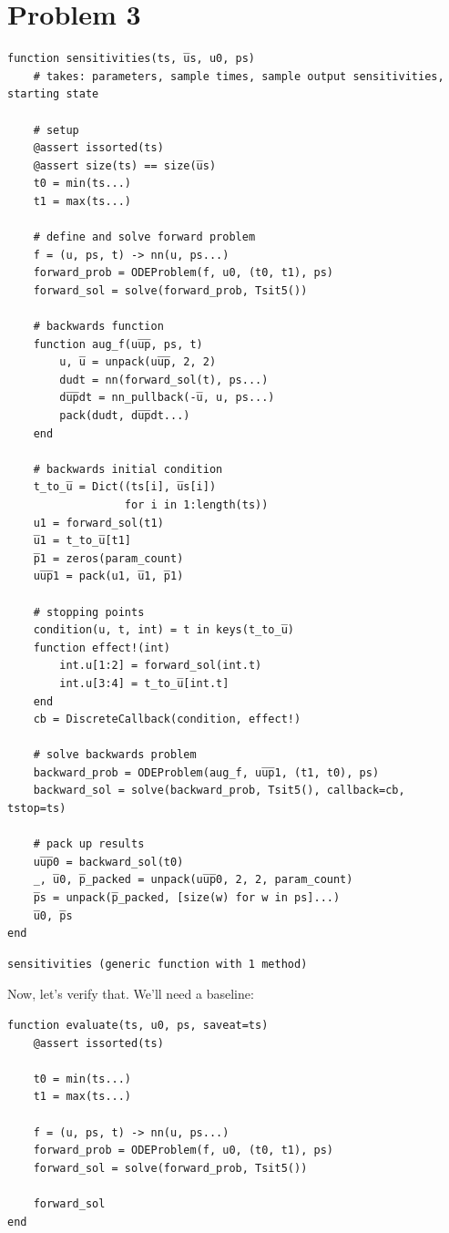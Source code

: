 \documentclass[11pt]{article}
\begin{document}
\section{Problem 3}
\label{sec:org3802e63}
\begin{verbatim}
function sensitivities(ts, u̅s, u0, ps)
    # takes: parameters, sample times, sample output sensitivities, starting state

    # setup
    @assert issorted(ts)
    @assert size(ts) == size(u̅s)
    t0 = min(ts...)
    t1 = max(ts...)

    # define and solve forward problem
    f = (u, ps, t) -> nn(u, ps...)
    forward_prob = ODEProblem(f, u0, (t0, t1), ps)
    forward_sol = solve(forward_prob, Tsit5())

    # backwards function
    function aug_f(uu̅p̅, ps, t)
        u, u̅ = unpack(uu̅p̅, 2, 2)
        dudt = nn(forward_sol(t), ps...)
        du̅p̅dt = nn_pullback(-u̅, u, ps...)
        pack(dudt, du̅p̅dt...)
    end

    # backwards initial condition
    t_to_u̅ = Dict((ts[i], u̅s[i])
                  for i in 1:length(ts))
    u1 = forward_sol(t1)
    u̅1 = t_to_u̅[t1]
    p̅1 = zeros(param_count)
    uu̅p̅1 = pack(u1, u̅1, p̅1)

    # stopping points
    condition(u, t, int) = t in keys(t_to_u̅)
    function effect!(int)
        int.u[1:2] = forward_sol(int.t)
        int.u[3:4] = t_to_u̅[int.t]
    end
    cb = DiscreteCallback(condition, effect!)

    # solve backwards problem
    backward_prob = ODEProblem(aug_f, uu̅p̅1, (t1, t0), ps)
    backward_sol = solve(backward_prob, Tsit5(), callback=cb, tstop=ts)

    # pack up results
    uu̅p̅0 = backward_sol(t0)
    _, u̅0, p̅_packed = unpack(uu̅p̅0, 2, 2, param_count)
    p̅s = unpack(p̅_packed, [size(w) for w in ps]...)
    u̅0, p̅s
end
\end{verbatim}

\begin{verbatim}
sensitivities (generic function with 1 method)
\end{verbatim}


Now, let's verify that. We'll need a baseline:

\begin{verbatim}
function evaluate(ts, u0, ps, saveat=ts)
    @assert issorted(ts)

    t0 = min(ts...)
    t1 = max(ts...)

    f = (u, ps, t) -> nn(u, ps...)
    forward_prob = ODEProblem(f, u0, (t0, t1), ps)
    forward_sol = solve(forward_prob, Tsit5())

    forward_sol
end
\end{verbatim}
\end{document}
